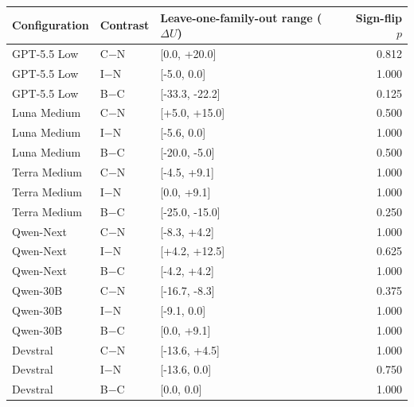 \begin{tabular}{lllr}
\toprule
Configuration & Contrast & Leave-one-family-out range ($\Delta U$) & Sign-flip $p$\\
\midrule
GPT-5.5 Low & C$-$N & [0.0, +20.0] & 0.812\\
GPT-5.5 Low & I$-$N & [-5.0, 0.0] & 1.000\\
GPT-5.5 Low & B$-$C & [-33.3, -22.2] & 0.125\\
Luna Medium & C$-$N & [+5.0, +15.0] & 0.500\\
Luna Medium & I$-$N & [-5.6, 0.0] & 1.000\\
Luna Medium & B$-$C & [-20.0, -5.0] & 0.500\\
Terra Medium & C$-$N & [-4.5, +9.1] & 1.000\\
Terra Medium & I$-$N & [0.0, +9.1] & 1.000\\
Terra Medium & B$-$C & [-25.0, -15.0] & 0.250\\
Qwen-Next & C$-$N & [-8.3, +4.2] & 1.000\\
Qwen-Next & I$-$N & [+4.2, +12.5] & 0.625\\
Qwen-Next & B$-$C & [-4.2, +4.2] & 1.000\\
Qwen-30B & C$-$N & [-16.7, -8.3] & 0.375\\
Qwen-30B & I$-$N & [-9.1, 0.0] & 1.000\\
Qwen-30B & B$-$C & [0.0, +9.1] & 1.000\\
Devstral & C$-$N & [-13.6, +4.5] & 1.000\\
Devstral & I$-$N & [-13.6, 0.0] & 0.750\\
Devstral & B$-$C & [0.0, 0.0] & 1.000\\
\bottomrule
\end{tabular}
